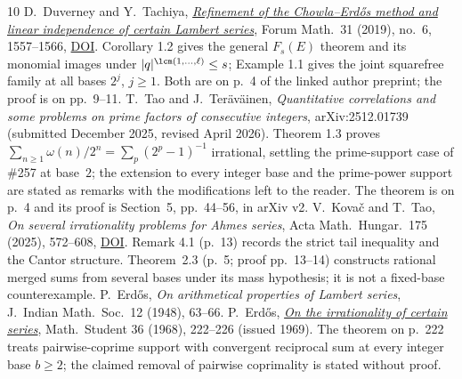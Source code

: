 \documentclass[11pt]{article}
\begin{document}
\begin{thebibliography}{10}
 D.~Duverney and Y.~Tachiya,
  \href{https://danielduverney.fr/documents/theorie-des-nombres/DuverneyTachiya190522.pdf}
  {\emph{Refinement of the Chowla--Erd\H{o}s method and linear independence
  of certain Lambert series}},
  Forum Math.\ 31 (2019), no.~6, 1557--1566,
  \href{https://doi.org/10.1515/forum-2018-0299}{DOI}.  Corollary 1.2 gives
  the general $F_s(E)$ theorem and its monomial images under
  $|q|^{\lcm(1,\dots,\ell)}\le s$; Example 1.1 gives the joint squarefree
  family at all bases \(2^j\), \(j\ge1\).  Both are on p.~4 of the linked
  author preprint; the proof is on pp.~9--11.
 T.~Tao and J.~Ter\"av\"ainen,
  \emph{Quantitative correlations and some problems on prime factors of
  consecutive integers}, arXiv:2512.01739 (submitted December 2025, revised
  April 2026).  Theorem 1.3 proves $\sum_{n\ge1}\omega(n)/2^n=\sum_p(2^p-1)^{-1}$
  irrational, settling the prime-support case of \#257 at base~$2$; the
  extension to every integer base and the prime-power support are stated as
  remarks with the modifications left to the reader.  The theorem is on
  p.~4 and its proof is Section~5, pp.~44--56, in arXiv v2.
 V.~Kova\v{c} and T.~Tao, \emph{On several irrationality
  problems for Ahmes series}, Acta Math.\ Hungar.\ 175 (2025), 572--608,
  \href{https://doi.org/10.1007/s10474-025-01528-0}{DOI}.  Remark 4.1
  (p.~13) records the strict tail inequality and the Cantor structure.
  Theorem~2.3 (p.~5; proof pp.~13--14) constructs rational merged sums from
  several bases under its mass hypothesis; it is not a fixed-base
  counterexample.
 P.~Erd\H{o}s, \emph{On arithmetical properties of Lambert
  series}, J.~Indian Math.\ Soc.\ 12 (1948), 63--66.
 P.~Erd\H{o}s,
  \href{https://users.renyi.hu/~p_erdos/1969-09.pdf}{\emph{On the
  irrationality of certain series}}, Math.\ Student 36 (1968), 222--226
  (issued 1969).  The theorem on p.~222 treats pairwise-coprime support with
  convergent reciprocal sum at every integer base $b\ge2$; the claimed
  removal of pairwise coprimality is stated without proof.
\end{thebibliography}

\companionpapercontext
\end{document}
